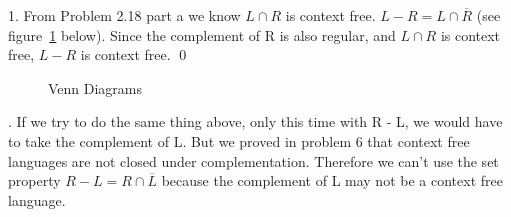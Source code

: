 \begin{problem}{7}
  \begin{solution}
    1. From Problem 2.18 part a we know $L \cap R$ is context free. $L - R = L \cap \overline{R}$ (see figure~\ref{fig:venn} below).
    Since the complement of R is also regular, and $L \cap R$ is context free, $L - R$ is context free. \qed
    \begin{figure}[H]
      \centering
      \caption{Venn Diagrams}
      \label{fig:venn}
    \end{figure}
    . If we try to do the same thing above, only this time with R - L, we would have to take the complement of L. But we proved in problem 6 that context free languages are not closed under complementation. Therefore we can't use the set property $R - L = R \cap \overline{L}$ because the complement of L may not be a context free language.
  \end{solution}
\end{problem}


